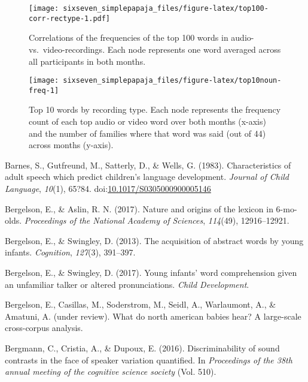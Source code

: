 \documentclass[man]{apa6}
\theoremstyle{definition}
\theoremstyle{definition}
\theoremstyle{definition}
\theoremstyle{remark}
\begin{document}
\begin{figure}
\centering
\texttt{[image: sixseven\_simplepapaja\_files/figure-latex/top100-corr-rectype-1.pdf]}
\caption{\label{fig:top100-corr-rectype}Correlations of the frequencies of
the top 100 words in audio- vs.~video-recordings. Each node represents
one word averaged across all participants in both months.}
\end{figure}

\begin{figure}
\texttt{[image: sixseven\_simplepapaja\_files/figure-latex/top10noun-freq-1]} \caption{Top 10 words by recording type. Each node represents the frequency count of each top audio or video word over both months (x-axis) and the number of families where that word was said (out of 44) across months (y-axis).}\label{fig:top10noun-freq}
\end{figure}

\setlength{\parindent}{-0.5in} \setlength{\leftskip}{0.5in}

\hypertarget{refs}{}
\hypertarget{ref-barnes1983characteristics}{}
Barnes, S., Gutfreund, M., Satterly, D., \& Wells, G. (1983).
Characteristics of adult speech which predict children's language
development. \emph{Journal of Child Language}, \emph{10}(1), 65?84.
doi:\href{https://doi.org/10.1017/S0305000900005146}{10.1017/S0305000900005146}

\hypertarget{ref-bergelson2017nature}{}
Bergelson, E., \& Aslin, R. N. (2017). Nature and origins of the lexicon
in 6-mo-olds. \emph{Proceedings of the National Academy of Sciences},
\emph{114}(49), 12916--12921.

\hypertarget{ref-bergelson2013acquisition}{}
Bergelson, E., \& Swingley, D. (2013). The acquisition of abstract words
by young infants. \emph{Cognition}, \emph{127}(3), 391--397.

\hypertarget{ref-bergelson2017young}{}
Bergelson, E., \& Swingley, D. (2017). Young infants' word comprehension
given an unfamiliar talker or altered pronunciations. \emph{Child
Development}.

\hypertarget{ref-bergelsonunderreview}{}
Bergelson, E., Casillas, M., Soderstrom, M., Seidl, A., Warlaumont, A.,
\& Amatuni, A. (under review). What do north american babies hear? A
large-scale cross-corpus analysis.

\hypertarget{ref-bergmann2016discriminability}{}
Bergmann, C., Cristia, A., \& Dupoux, E. (2016). Discriminability of
sound contrasts in the face of speaker variation quantified. In
\emph{Proceedings of the 38th annual meeting of the cognitive science
society} (Vol. 510).
\end{document}
